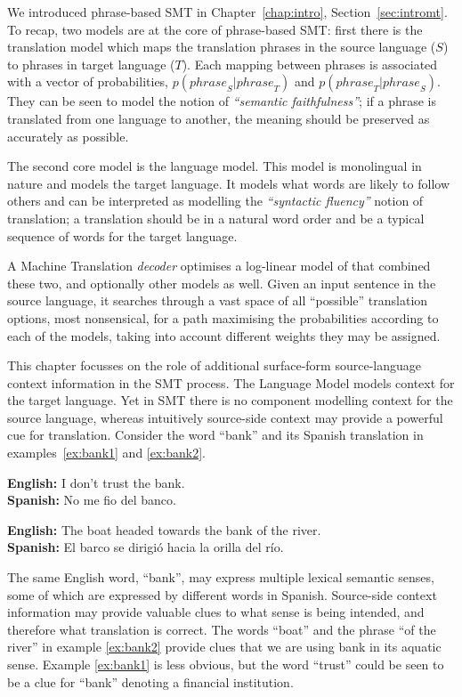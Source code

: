 We introduced phrase-based SMT in Chapter~\ref{chap:intro},
Section~\ref{sec:intromt}. To recap, two models are at the core of
phrase-based SMT: first there is the translation model which maps the
translation phrases in the source language ($S$) to phrases in target language
($T$). Each mapping between phrases is associated with a vector of
probabilities, $p({phrase}_S|{phrase}_T)$ and $p({phrase}_T|{phrase}_S)$. They
can be seen to model the notion of \emph{``semantic faithfulness''}; if a
phrase is translated from one language to another, the meaning should be
preserved as accurately as possible.

The second core model is the language model. This model is monolingual
in nature and models the target language. It models what words are
likely to follow others and can be interpreted as modelling the
\emph{``syntactic fluency''} notion of translation; a translation should be
in a natural word order and be a typical sequence of words for the
target language.

A Machine Translation \emph{decoder} optimises a log-linear model of that
combined these two, and optionally other models as well. Given an input
sentence in the source language, it searches through a vast space of all
``possible'' translation options, most nonsensical, for a path maximising the
probabilities according to each of the models, taking into account different
weights they may be assigned.

This chapter focusses on the role of additional
surface-form source-language context information in the SMT process. The Language Model models context
for the target language. Yet in SMT there is no component modelling
context for the source language, whereas intuitively source-side context may
provide a powerful cue for translation. Consider the word ``bank'' and its
Spanish translation in examples~\ref{ex:bank1} and \ref{ex:bank2}.

\begin{exe} %
\ex \textbf{English:} I don't trust the bank. \\
    \textbf{Spanish:} No me fio del banco.
\label{ex:bank1}

\ex \textbf{English:} The boat headed towards the bank of the river. \\
    \textbf{Spanish:} El barco se dirigió hacia la orilla del río.
\label{ex:bank2}
\end{exe}

The same English word, ``bank'', may express multiple lexical semantic senses, some of
which are expressed by different words in Spanish. Source-side context
information may provide valuable clues to what sense is being intended, and
therefore what translation is correct.  The words ``boat'' and the phrase ``of
the river'' in example \ref{ex:bank2} provide clues that we are using
bank in its aquatic sense. Example \ref{ex:bank1} is less obvious, but the
word ``trust'' could be seen to be a clue for ``bank'' denoting a
financial institution.

